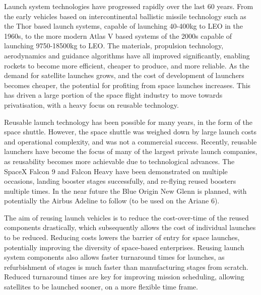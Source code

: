   
  Launch system technologies have progressed rapidly over the last 60 years. From the early vehicles based on intercontinental ballistic missile technology such as the Thor based launch systems, capable of launching 40-400kg to LEO in the 1960s, to the more modern Atlas V based systems of the 2000s capable of launching 9750-18500kg to LEO\cite{Kendall2010}. 
  The materials, propulsion technology, aerodynamics and guidance algorithms have all improved significantly, enabling  rockets to become more efficient, cheaper to produce, and more reliable. As the demand for satellite launches grows, and the cost of development of launchers becomes cheaper, the potential for profiting from space launches increases. 
  This has driven a large portion of the space flight industry to move towards privatisation, with a heavy focus on reusable technology. 
   
  Reusable launch technology has been possible for many years, in the form of the space shuttle. However, the space shuttle was weighed down by large launch costs and operational complexity, and was not a commercial success\cite{Launius2006}. Recently, reusable launchers have become the focus of many of the largest private launch companies, as reusability becomes more achievable due to technological advances\cite{Foust2018,Mosher2018}. The SpaceX Falcon 9 and Falcon Heavy have been demonstrated on multiple occasions, landing booster stages successfully, and re-flying reused boosters multiple times\cite{Foust2018}. In the near future the Blue Origin New Glenn is planned\cite{Foust2018}, with potentially the Airbus Adeline to follow (to be used on the Ariane 6)\cite{Adeline}. 
  
       The aim of reusing launch vehicles is to reduce the cost-over-time of the reused components drastically, which subsequently allows the cost of individual launches to be reduced\cite{RichardWebb2016}. Reducing costs lowers the barrier of entry for space launches, potentially improving the diversity of space-based enterprises. 
       Reusing launch system components also allows faster turnaround times for launches, as refurbishment of stages is much faster than manufacturing stages from scratch. Reduced turnaround times are key for improving mission scheduling, allowing satellites to be launched sooner, on a more flexible time frame. 
  
